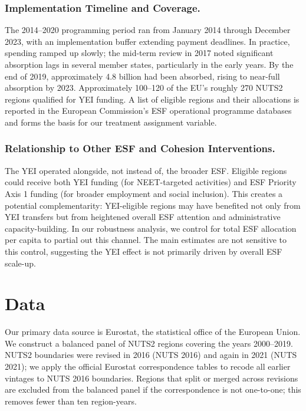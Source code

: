 \documentclass[12pt]{article}
\begin{document}
\subsubsection*{Implementation Timeline and Coverage.} The 2014--2020 programming period ran from January 2014 through December 2023, with an implementation buffer extending payment deadlines. In practice, spending ramped up slowly; the mid-term review in 2017 noted significant absorption lags in several member states, particularly in the early years. By the end of 2019, approximately \texteuro{}4.8 billion had been absorbed, rising to near-full absorption by 2023. Approximately 100--120 of the EU's roughly 270 NUTS2 regions qualified for YEI funding. A list of eligible regions and their allocations is reported in the European Commission's ESF operational programme databases and forms the basis for our treatment assignment variable.

\subsubsection*{Relationship to Other ESF and Cohesion Interventions.} The YEI operated alongside, not instead of, the broader ESF. Eligible regions could receive both YEI funding (for NEET-targeted activities) and ESF Priority Axis 1 funding (for broader employment and social inclusion). This creates a potential complementarity: YEI-eligible regions may have benefited not only from YEI transfers but from heightened overall ESF attention and administrative capacity-building. In our robustness analysis, we control for total ESF allocation per capita to partial out this channel. The main estimates are not sensitive to this control, suggesting the YEI effect is not primarily driven by overall ESF scale-up.

\section{Data}

Our primary data source is Eurostat, the statistical office of the European Union. We construct a balanced panel of NUTS2 regions covering the years 2000--2019. NUTS2 boundaries were revised in 2016 (NUTS 2016) and again in 2021 (NUTS 2021); we apply the official Eurostat correspondence tables to recode all earlier vintages to NUTS 2016 boundaries. Regions that split or merged across revisions are excluded from the balanced panel if the correspondence is not one-to-one; this removes fewer than ten region-years.
\end{document}
